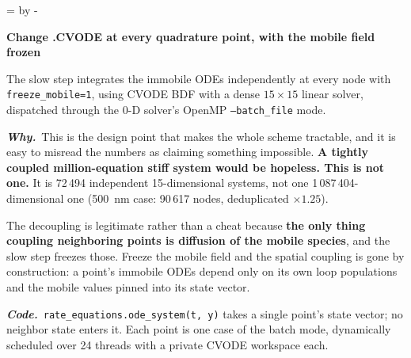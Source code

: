 \documentclass[11pt,a4paper]{article}
\newcommand{\code}[1]{\texttt{\small #1}}
\newcommand{\needlines}[1]{%
  \par\dimen0=\pagegoal \advance\dimen0 by -\pagetotal
  \ifdim\dimen0<#1\baselineskip \newpage \fi}
\newcounter{chg}
\newcommand{\change}[1]{%
  \needlines{4}%
  \refstepcounter{chg}%
  \par\medskip\noindent
  {\bfseries\boldmath Change \thechg.\quad #1}%
  \par\nobreak\smallskip}
\newcommand{\why}[1]{\par\noindent\textbf{\itshape Why.}\ #1\par}
\newcommand{\impact}[1]{\par\noindent\textbf{\itshape Code.}\ #1\par}
\begin{document}
\change{CVODE at every quadrature point, with the mobile field frozen}
\label{chg:cvode}
The slow step integrates the immobile ODEs independently at every node with
\code{freeze\_mobile=1}, using CVODE BDF with a dense $15\times15$ linear
solver, dispatched through the 0-D solver's OpenMP \code{--batch\_file} mode.
\why{This is the design point that makes the whole scheme tractable, and it is
easy to misread the numbers as claiming something impossible. \textbf{A tightly
coupled million-equation stiff system would be hopeless. This is not one.} It
is 72\,494 independent 15-dimensional systems, not one 1\,087\,404-dimensional
one (500~nm case: 90\,617 nodes, deduplicated $\times1.25$).

The decoupling is legitimate rather than a cheat because \textbf{the only thing
coupling neighboring points is diffusion of the mobile species}, and the slow
step freezes those. Freeze the mobile field and the spatial coupling is gone
by construction: a point's immobile ODEs depend only on its own loop
populations and the mobile values pinned into its state vector.}
\impact{\code{rate\_equations.ode\_system(t, y)} takes a single point's state
vector; no neighbor state enters it. Each point is one case of the batch mode,
dynamically scheduled over 24 threads with a private CVODE workspace each.}
\end{document}
